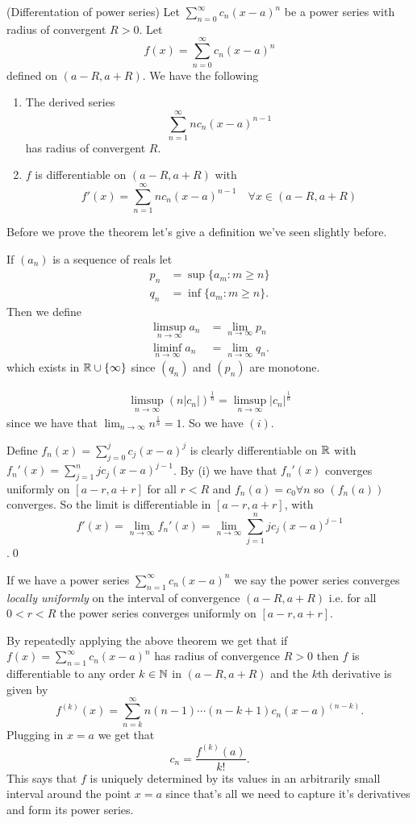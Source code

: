 \documentclass{article}
\begin{document}
\begin{theorem}
	(Differentation of power series) Let $ \sum_{n=0}^\infty c_n(x-a)^n $ be a power series with radius of convergent $ R>0 $. Let
	\[
		f(x)=\sum_{n=0}^\infty c_n(x-a)^n
	\]
	defined on $ (a-R,a+R) $. We have the following
	\begin{enumerate}
		\item The derived series \[
		  \sum_{n=1}^\infty nc_n(x-a)^{n-1}
	  \]
	  has radius of convergent $ R $.
  \item $ f $ is differentiable on $ (a-R,a+R) $ with
	  \[
		  f'(x)=\sum_{n=1}^\infty nc_n(x-a)^{n-1}\quad\forall x\in(a-R,a+R)
	  \]
	\end{enumerate}
\end{theorem}
\pf
Before we prove the theorem let's give a definition we've seen slightly before.
\begin{definition}
	If $ (a_n) $ is a sequence of reals let 
	\begin{align*}
		p_n&= \sup\{a_m: m\ge n\}\\
		q_n&=\inf\{a_m:m\ge n\}.
	\end{align*}
        Then we define
	\begin{align*}
		\limsup_{n\to\infty}a_n&=\lim_{n\to\infty}p_n\\
		\liminf_{n\to\infty}a_n&=\lim_{n\to\infty}q_n.
	\end{align*}
	which exists in $ \mathbb{R}\cup\{\infty\} $ since $ (q_n) $ and $ (p_n) $ are monotone.
\end{definition}
\begin{align*}
	\limsup_{n\to\infty}(n|c_n|)^{\frac 1n}=\limsup_{n\to\infty}|c_n|^{\frac 1n}
\end{align*}
since we have that $ \lim_{n\to\infty}n^{\frac 1n} = 1$. So we have $ (i) $.\par
Define $ f_n(x)=\sum_{j=0}^jc_j(x-a)^j $ is clearly differentiable on $ \mathbb{R} $ with $ f_n'(x)=\sum_{j=1}^njc_j(x-a)^{j-1} $. By (i) we have that $ f_n'(x) $ converges uniformly on $ [a-r,a+r] $ for all $ r<R $ and $ f_n(a)=c_0 \forall n $ so $ (f_n(a)) $ converges. So the limit is differentiable in $ [a-r,a+r] $, with \[ f'(x)=\lim_{n\to\infty}f_n'(x) =\lim_{n\to\infty}\sum_{j=1}^njc_j(x-a)^{j-1}\].\qed\par
If we have a power series $ \sum_{n=1}^\infty c_n(x-a)^n $ we say the power series converges \textit{locally uniformly} on the interval of convergence $ (a-R,a+R) $ i.e. for all $ 0<r<R $ the power series converges uniformly on $ [a-r,a+r] $.
\begin{remark}
	By repeatedly applying the above theorem we get that if $f(x)= \sum_{n=1}^\infty c_n(x-a)^n $ has radius of convergence $ R>0 $ then $ f $ is differentiable to any order $ k\in\mathbb{N} $ in $ (a-R,a+R) $ and the $ k $th derivative is given by
	\[
		f^{(k)}(x)=\sum_{n=k}^\infty n(n-1)\cdots(n-k+1)c_n(x-a)^{(n-k)}.
	\]
	Plugging in $ x=a $ we get that 
	\[
		c_n=\frac{f^{(k)}(a)}{k!}.
	\]
	This says that $ f $ is uniquely determined by its values in an arbitrarily small interval around the point $ x=a $ since that's all we need to capture it's derivatives and form its power series.
\end{remark}
\end{document}
